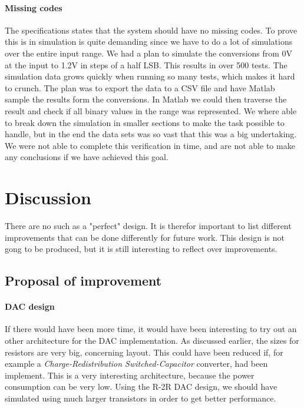 \documentclass[english, 12pt, a4paper]{ifimaster}
\begin{document}
\subsubsection{Missing codes}
The specifications states that the system should have no missing codes. 
To prove this is in simulation is quite demanding since we have to do a lot of simulations over the entire input range.
We had a plan to simulate the conversions from 0V at the input to 1.2V in steps of a half LSB. This results in over 500 tests. 
The simulation data grows quickly when running so many tests, which makes it hard to crunch. 
The plan was to export the data to a CSV file and have Matlab sample the results form the conversions.
In Matlab we could then traverse the result and check if all binary values in the range was represented.
We where able to break down the simulation in smaller sections to make the task possible to handle, but in the end the data sets was so vast that this was a big undertaking.
We were not able to complete this verification in time, and are not able to make any conclusions if we have achieved this goal.



\chapter{Discussion}
There are no such as a "perfect" design. It is therefor important to list different improvements that
can be done differently for future work. This design is not gong to be produced, but it is still 
interesting to reflect over improvements. 

\section{Proposal of improvement}
\subsubsection{DAC design}
If there would have been more time, it would have been interesting to try out an other architecture
for the DAC implementation. As discussed earlier, the sizes for resistors are very big, concerning
layout. This could have been reduced if, for example a \textit{Charge-Redistribution Switched-Capacitor} 
converter, had been implement. This is a very interesting architecture, because the power consumption
can be very low. 
Using the R-2R DAC design, we should have simulated using much larger transistors in order to get better performance.
\end{document}
